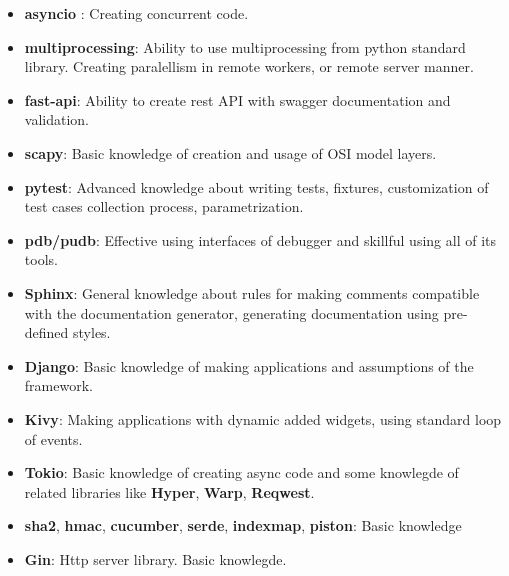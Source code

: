 \documentclass[11pt,a4paper,sans]{moderncv} %
\begin{document}
 {
    \begin{itemize}
    \item \textbf{asyncio} : Creating concurrent code.
    \item \textbf{multiprocessing}: Ability to use multiprocessing from python standard library. Creating paralellism in remote workers, or remote server manner.
    \item \textbf{fast-api}: Ability to create rest API with swagger documentation and validation.
    \item \textbf{scapy}: Basic knowledge of creation and usage of OSI model layers.
    \item \textbf{pytest}: Advanced knowledge about writing tests, fixtures, customization of test cases collection process, parametrization.
    \item \textbf{pdb/pudb}: Effective using interfaces of debugger and skillful using all of its tools.
    \item \textbf{Sphinx}: General knowledge about rules for making comments compatible with the documentation generator, generating documentation using pre-defined styles.
    \item \textbf{Django}: Basic knowledge of making applications and assumptions of the framework.
    \item \textbf{Kivy}: Making applications with dynamic added widgets, using standard loop of events.
    \end{itemize}
}

 {
    \begin{itemize}
        \item \textbf{Tokio}: Basic knowledge of creating async code and some knowlegde of related libraries like \textbf{Hyper}, \textbf{Warp}, \textbf{Reqwest}.
        \item \textbf{sha2}, \textbf{hmac}, \textbf{cucumber}, \textbf{serde}, \textbf{indexmap}, \textbf{piston}: Basic knowledge
    \end{itemize}
}

 {
    \begin{itemize}
        \item \textbf{Gin}: Http server library. Basic knowlegde.
    \end{itemize}
}
\end{document}
